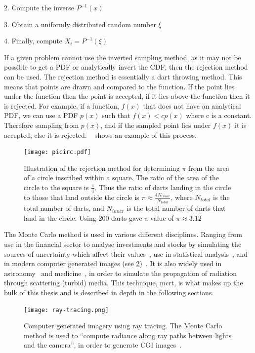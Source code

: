 2. Compute the inverse $P^{-1}(x)$

3. Obtain a uniformly distributed random number $\xi$

4. Finally, compute $X_i = P^{-1}(\xi)$

\medskip

If a given problem cannot use the inverted sampling method, as it may not be possible to get a PDF or analytically invert the CDF, then the rejection method can be used.
The rejection method is essentially a dart throwing method.
This means that points are drawn and compared to the function.
If the point lies under the function then the point is accepted, if it lies above the function then it is rejected.
For example, if a function, $f(x)$ that does not have an analytical PDF, we can use a PDF $p(x)$ such that $f(x) < cp(x)$ where c is a constant.
Therefore sampling from $p(x)$, and if the sampled point lies under $f(x)$ it is accepted, else it is rejected.
~ shows an example of this process.

\begin{figure}[!ht]
	\centering
	\texttt{[image: picirc.pdf]}
	\caption{Illustration of the rejection method for determining $\pi$ from the area of a circle inscribed within a square. The ratio of the area of the circle to the square is $\tfrac{\pi}{4}$. Thus the ratio of darts landing in the circle to those that land outside the circle is $\pi \approx \tfrac{4N_{inner}}{N_{total}}$, where $N_{total}$ is the total number of darts, and $N_{inner}$ is the total number of darts that land in the circle. Using 200 darts gave a value of $\pi \approx 3.12$}
	\label{fig:picircle}
\end{figure}


The Monte Carlo method is used in various different disciplines. Ranging from use in the financial sector to analyse investments and stocks by simulating the sources of uncertainty which affect their values~\cite{jackel2002monte,finaceprrof}, use in statistical analysis~\cite{wall2012practical}, and in modern computer generated images (see \cref{fig:ray-trace})~\cite{Kajiyarendering,Cookraytracing}. It is also widely used in astronomy~\cite{robitaille2011hyperion,harries2014torus} and medicine~\cite{valentine2011monte,campbell2015monte}, in order to simulate the propagation of radiation through scattering (turbid) media. This technique, \gls*{mcrt}, is what makes up the bulk of this thesis and is described in depth in the following sections.

\begin{figure}[!htb]
\centering
\texttt{[image: ray-tracing.png]}
\caption{Computer generated imagery using ray tracing. The Monte Carlo method is used to ``compute radiance along ray paths between lights and the camera'', in order to generate CGI images~\cite{pharr2016physically}.}
\label{fig:ray-trace}
\end{figure}
\newpage
